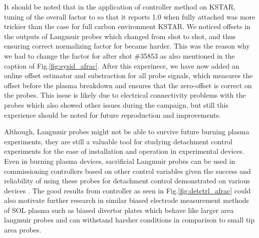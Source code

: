 It should be noted that in the application of \Afrac controller method on KSTAR, tuning of the overall factor to \Afrac so that it reports 1.0 when fully attached was more trickier than the case for full carbon environment KSTAR\cite{Eldon_2022_PPCF}.
We noticed offsets in the outputs of Langmuir probes which changed from shot to shot, and thus ensuring correct normalizing factor for \Afrac became harder.
This was the reason why we had to change the factor for \Afrac after shot \#35853 as also mentioned in the caption of Fig.\ref{fig:sysid_afrac}.
After this experinece, we have now added an online offset estimator and substraction for all probe signals, which measures the offset before the plasma breakdown and ensures that the zero-offset is correct on the probes.
This issue is likely due to electrical connectivity problems with the probes which also showed other issues during the campaign, but still this experience should be noted for future reproduction and improvements.

Although, Langmuir probes might not be able to survive future burning plasma experiments, they are still a valuable tool for studying detachment control experiments for the ease of installation and operation in experimental devices.
Even in burning plasma devices, sacrificial Langmuir probes can be used in commissioning controllers based on other control variables given the success and reliability of using these probes for detachment control demonstrated on various devices \cite{Eldon_2021_NME, Guillemaut_2017_PPCF, Yuan_2020_FED}.
The good results from \Afrac controller as seen in Fig.\ref{fig:detctrl_afrac} could also motivate further research in similar biased electrode measurement methods of SOL plasma such as biased divertor plates \cite{Toi_2023_NF, Cui_2024_NF} which behave like larger area langmuir probes and can withstand harsher conditions in comparison to small tip area probes.

